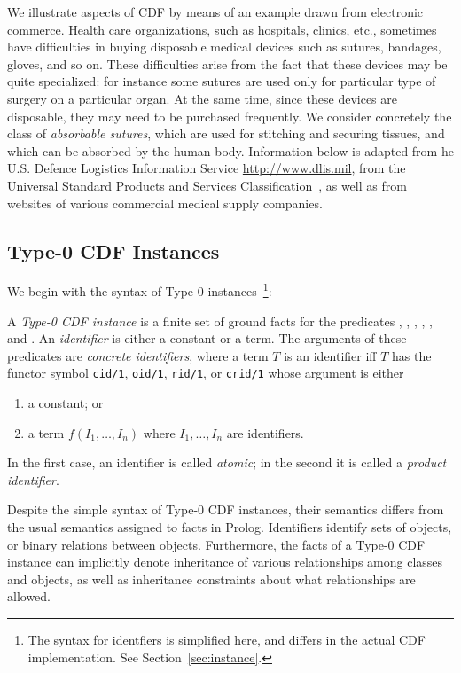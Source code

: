 We illustrate aspects of CDF by means of an example drawn from
electronic commerce.  Health care organizations, such as hospitals,
clinics, etc., sometimes have difficulties in buying disposable
medical devices such as sutures, bandages, gloves, and so on.  These
difficulties arise from the fact that these devices may be quite
specialized: for instance some sutures are used only for particular
type of surgery on a particular organ.  At the same time, since these
devices are disposable, they may need to be purchased frequently.  We
consider concretely the class of {\em absorbable sutures}, which are
used for stitching and securing tissues, and which can be absorbed by
the human body.  Information below is adapted from he U.S. Defence
Logistics Information Service \url{http://www.dlis.mil}, from the
Universal Standard Products and Services Classification~\cite{UNSPSC},
as well as from websites of various commercial medical supply
companies.

\subsection{Type-0 CDF Instances} \label{sec:type0} 

We begin with the syntax of Type-0 instances~\footnote{The syntax for
  identfiers is simplified here, and differs in the actual CDF
  implementation. See Section~\ref{sec:instance}.}:

\begin{definition} \label{def:ids}
A {\em Type-0 CDF instance} is a finite set of ground facts for the
predicates , , ,
, , and .  An {\em
identifier} is either a constant or a term.  The arguments of these
predicates are {\em concrete identifiers}, where a term $T$ is an
identifier iff $T$ has the functor symbol {\tt cid/1}, {\tt oid/1},
{\tt rid/1}, or {\tt crid/1} whose argument is either

\begin{enumerate}
\item a constant; or 
\item a term $f(I_1,\ldots,I_n)$ where $I_1,\ldots,I_n$ are identifiers.
\end{enumerate}
In the first case, an identifier is called {\em atomic}; in the second
it is called a {\em product identifier}.
\end{definition}

Despite the simple syntax of Type-0 CDF instances, their semantics
differs from the usual semantics assigned to facts in Prolog.
Identifiers identify sets of objects, or binary relations between
objects.  Furthermore, the facts of a Type-0 CDF instance can
implicitly denote inheritance of various relationships among classes
and objects, as well as inheritance constraints about what
relationships are allowed.

